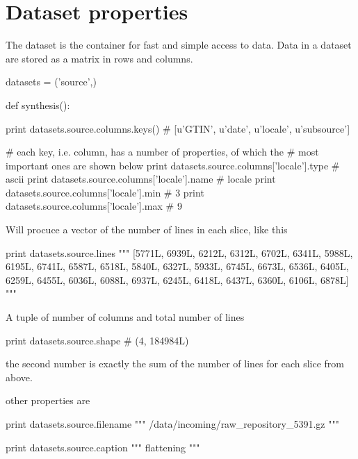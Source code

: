 \section{Dataset properties}
The dataset is the container for fast and simple access to data.  Data
in a dataset are stored as a matrix in rows and columns.

\begin{python}
datasets = ('source',)

def synthesis():
\end{python}

\begin{python}
  print datasets.source.columns.keys()
  # [u'GTIN', u'date', u'locale', u'subsource']

  # each key, i.e. column, has a number of properties, of which the
  # most important ones are shown below
  print datasets.source.columns['locale'].type
  # ascii
  print datasets.source.columns['locale'].name
  # locale
  print datasets.source.columns['locale'].min
  # 3
  print datasets.source.columns['locale'].max
  # 9
  
\end{python}

Will procuce a vector of the number of lines in each slice, like this

\begin{python}
  print datasets.source.lines
  """
[5771L, 6939L, 6212L, 6312L, 6702L, 6341L, 5988L, 6195L,
 6741L, 6587L, 6518L, 5840L, 6327L, 5933L, 6745L, 6673L,
 6536L, 6405L, 6259L, 6455L, 6036L, 6088L, 6937L, 6245L,
 6418L, 6437L, 6360L, 6106L, 6878L]
"""
\end{python}

A tuple of number of columns and total number of lines

\begin{python}
  print datasets.source.shape
  # (4, 184984L)
\end{python}
the second number is exactly the sum of the number of lines for each
slice from above.

other properties are

\begin{python}
  print datasets.source.filename
  """
/data/incoming/raw_repository_5391.gz
"""
\end{python}

\begin{python}
  print datasets.source.caption
  """
flattening
"""
\end{python}


